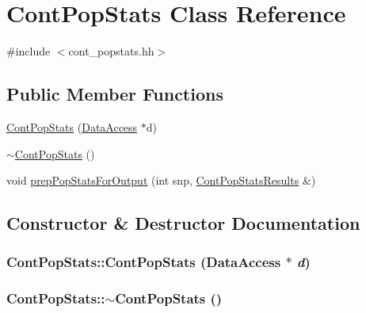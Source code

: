 \hypertarget{classContPopStats}{
\section{ContPopStats Class Reference}
\label{classContPopStats}
}


{\ttfamily \#include $<$cont\_\-popstats.hh$>$}

\subsection*{Public Member Functions}
\begin{DoxyCompactItemize}
\item 
\hyperlink{classContPopStats_acca80293398e197b710f0b3087aa5a35}{ContPopStats} (\hyperlink{classDataAccess}{DataAccess} $\ast$d)
\item 
\hyperlink{classContPopStats_ae3a20e08cdc2e52ae52fb81fab5230f6}{$\sim$ContPopStats} ()
\item 
void \hyperlink{classContPopStats_a6af3b120a6775e035946fff299e4da1b}{prepPopStatsForOutput} (int snp, \hyperlink{structContPopStatsResults}{ContPopStatsResults} \&)
\end{DoxyCompactItemize}


\subsection{Constructor \& Destructor Documentation}
\hypertarget{classContPopStats_acca80293398e197b710f0b3087aa5a35}{
\subsubsection[{ContPopStats}]{\setlength{\rightskip}{0pt plus 5cm}ContPopStats::ContPopStats ({\bf DataAccess} $\ast$ {\em d})}}
\label{classContPopStats_acca80293398e197b710f0b3087aa5a35}
\hypertarget{classContPopStats_ae3a20e08cdc2e52ae52fb81fab5230f6}{
\subsubsection[{$\sim$ContPopStats}]{\setlength{\rightskip}{0pt plus 5cm}ContPopStats::$\sim$ContPopStats ()}}
\label{classContPopStats_ae3a20e08cdc2e52ae52fb81fab5230f6}


